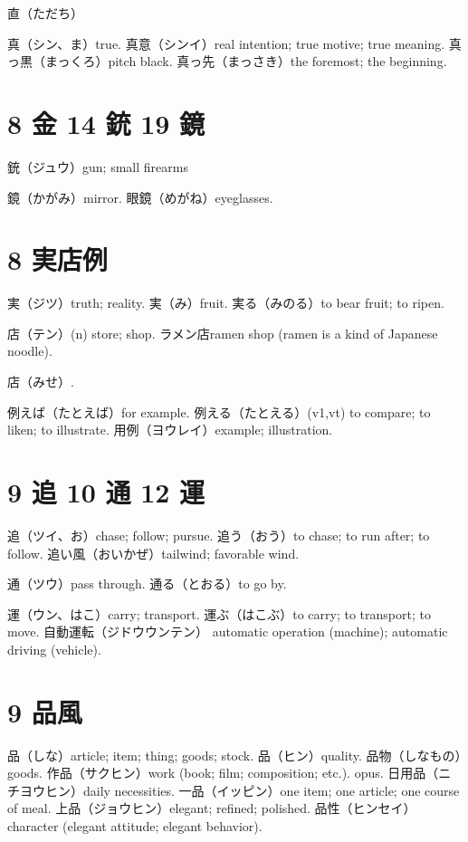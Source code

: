 直（ただち）

真（シン、ま）true.
真意（シンイ）real intention; true motive; true meaning.
真っ黒（まっくろ）pitch black.
真っ先（まっさき）the foremost; the beginning.

\section{8 金 14 銃 19 鏡}

銃（ジュウ）gun; small firearms

鏡（かがみ）mirror.
眼鏡（めがね）eyeglasses.

\section{8 実店例}

実（ジツ）truth; reality.
実（み）fruit.
実る（みのる）to bear fruit; to ripen.

店（テン）(n) store; shop.
ラメン店ramen shop (ramen is a kind of Japanese noodle).

店（みせ）.

例えば（たとえば）for example.
例える（たとえる）(v1,vt)
to compare; to liken; to illustrate.
用例（ヨウレイ）example; illustration.

\section{9 追 10 通 12 運}

追（ツイ、お）chase; follow; pursue.
追う（おう）to chase; to run after; to follow.
追い風（おいかぜ）tailwind; favorable wind.

通（ツウ）pass through.
通る（とおる）to go by.

運（ウン、はこ）carry; transport.
運ぶ（はこぶ）to carry; to transport; to move.
自動運転（ジドウウンテン）
automatic operation (machine); automatic driving (vehicle).

\section{9 品風}

品（しな）article; item; thing; goods; stock.
品（ヒン）quality.
品物（しなもの）goods.
作品（サクヒン）work (book; film; composition; etc.). opus.
日用品（ニチヨウヒン）daily necessities.
一品（イッピン）one item; one article; one course of meal.
上品（ジョウヒン）elegant; refined; polished.
品性（ヒンセイ）character (elegant attitude; elegant behavior).

